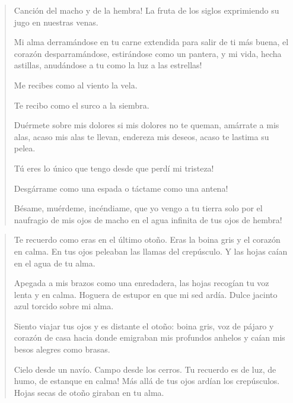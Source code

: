 \documentclass[12pt]{article}
\begin{document}
\clearpage
{}
\begin{verse}
Canción del macho y de la hembra!  
La fruta de los siglos  
exprimiendo su jugo  
en nuestras venas.  
	
Mi alma derramándose en tu carne extendida  
para salir de ti más buena,  
el corazón desparramándose,  
estirándose como un pantera,  
y mi vida, hecha astillas, anudándose  
a tu como la luz a las estrellas!  
	
Me recibes  
como al viento la vela.  
	
Te recibo  
como el surco a la siembra.  
	
Duérmete sobre mis dolores  
si mis dolores no te queman,  
amárrate a mis alas,  
acaso mis alas te llevan,  
endereza mis deseos,  
acaso te lastima su pelea.  
	
Tú eres lo único que tengo  
desde que perdí mi tristeza!  
	
Desgárrame como una espada  
o táctame como una antena!  
	
Bésame,  
muérdeme,  
incéndiame,  
que yo vengo a tu tierra  
solo por el naufragio de mis ojos de macho  
en el agua infinita de tus ojos de hembra!

\end{verse}

\clearpage
{}
\begin{verse}
Te recuerdo como eras en el último otoño.  
Eras la boina gris y el corazón en calma.  
En tus ojos peleaban las llamas del crepúsculo.  
Y las hojas caían en el agua de tu alma.  
	
Apegada a mis brazos como una enredadera,  
las hojas recogían tu voz lenta y en calma.  
Hoguera de estupor en que mi sed ardía.  
Dulce jacinto azul torcido sobre mi alma.  
	
Siento viajar tus ojos y es distante el otoño:  
boina gris, voz de pájaro y corazón de casa  
hacia donde emigraban mis profundos anhelos  
y caían mis besos alegres como brasas.  
	
Cielo desde un navío. Campo desde los cerros.  
Tu recuerdo es de luz, de humo, de estanque en calma!  
Más allá de tus ojos ardían los crepúsculos.  
Hojas secas de otoño giraban en tu alma.

\end{verse}
\end{document}
